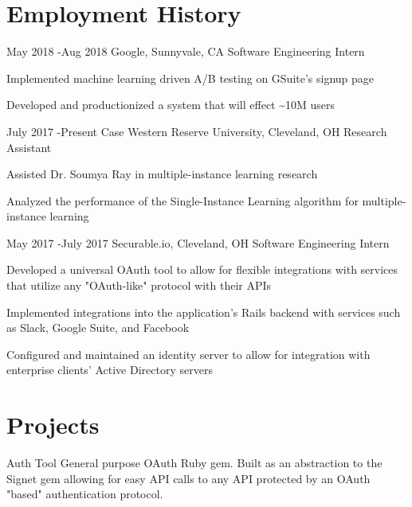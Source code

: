 \documentclass[10pt]{article} %
\begin{document}

\section{Employment History}

\job
{May 2018 -}{Aug 2018}
{Google, }{Sunnyvale, CA}
{Software Engineering Intern}
{
    \begin{itemize-noindent}
        \item{Implemented machine learning driven A/B testing on GSuite's signup page}
        \item{Developed and productionized a system that will effect \textasciitilde10M users}
    \end{itemize-noindent}
}

\job
{July 2017 -}{Present}
{Case Western Reserve University, }{Cleveland, OH}
{Research Assistant}
{
    \begin{itemize-noindent}
        \item{Assisted Dr. Soumya Ray in multiple-instance learning research}
        \item{Analyzed the performance of the Single-Instance Learning algorithm for multiple-instance learning}
    \end{itemize-noindent}
}

\job
{May 2017 -}{July 2017}
{Securable.io, }{Cleveland, OH}
{Software Engineering Intern}
{
\begin{itemize-noindent}
\item{Developed a universal OAuth tool to allow for flexible integrations with services that utilize any "OAuth-like" protocol with their APIs}
\item{Implemented integrations into the application's Rails backend with services such as Slack, Google Suite, and Facebook}
\item{Configured and maintained an identity server to allow for integration with enterprise clients' Active Directory servers}
\end{itemize-noindent}
}

\section{Projects}
\project
{Auth Tool}
{General purpose OAuth Ruby gem. Built as an abstraction to the Signet gem allowing for easy API calls to any API protected by an OAuth "based" authentication protocol.}
\end{document}
